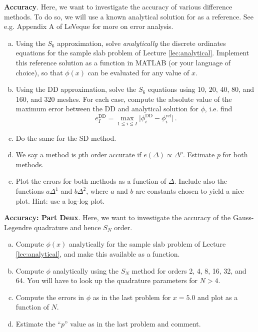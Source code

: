 \begin{exercises}
  \item \textbf{Accuracy}.  Here, we want to investigate the accuracy of various difference methods.  To do so, we will use a known analytical solution for as a reference.  See e.g. Appendix A of LeVeque \cite{leveque2007fdm} for more on error analysis.
  \begin{enumerate}[(a)]
    \item Using the $S_6$ approximation, solve \textit{analytically} the discrete ordinates equations for the sample slab problem of Lecture \ref{lec:analytical}.  Implement this reference solution as a function in MATLAB (or your language of choice), so that $\phi(x)$ can be evaluated for any value of $x$.        
    \item Using the DD approximation, solve the $S_6$ equations using 10, 20, 40, 80, and 160, and 320 meshes.  For each case, compute the absolute value of the maximum error between the DD and analytical solution for $\phi$, i.e. find 
    \begin{equation*}
     e^{\text{DD}}_I = \max_{1\leq i \leq I} \Big|\phi^{\text{DD}}_{i}-\phi_{i}^{\text{ref}} \Big |  \, .
    \end{equation*}
    \item Do the same for the SD method.
    \item We say a method is $p$th order accurate if $e(\Delta) \propto \Delta^p$.  Estimate $p$ for both methods. 
    \item Plot the errors for both methods as a function of $\Delta$.  Include also the functions $a\Delta^1$ and $b\Delta^2$, where $a$ and $b$ are constants chosen to yield a nice plot.  Hint: use a log-log plot.
   \end{enumerate}

  \item \textbf{Accuracy: Part Deux}.  Here, we want to investigate the accuracy of the Gauss-Legendre quadrature and hence $S_N$ order.  
  \begin{enumerate}[(a)]
    \item Compute $\phi(x)$ analytically for the sample slab problem of Lecture \ref{lec:analytical}, and make this available as a function.
    \item Compute $\phi$ analytically using the $S_N$ method for orders 2, 4, 8, 16, 32, and 64.  You will have to look up the quadrature parameters for $N > 4$.  
    \item Compute the errors in $\phi$ as in the last problem for $x = 5.0$ and plot as a function of $N$.  
    \item Estimate the ``$p$'' value as in the last problem and comment.  
   \end{enumerate}



\end{exercises}
